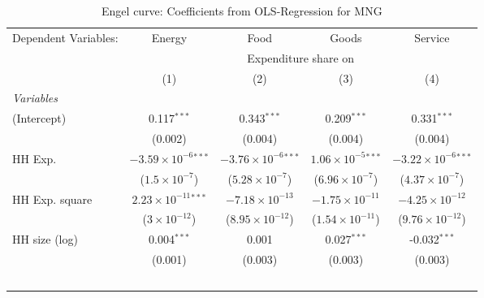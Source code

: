 
\begin{table}[htbp!]
   \centering
   \small
   \begin{adjustbox}{width = 1\textwidth, max height = 0.95\textheight, center}
      \begin{threeparttable}[b]
         \caption{\label{tab:Engel_parametric_MNG} Engel curve: Coefficients from OLS-Regression for MNG}
         \begin{tabular}{lcccc}
            \tabularnewline \midrule \midrule
            Dependent Variables: & Energy                         & Food                           & Goods                         & Service\\  
             & \multicolumn{4}{c}{Expenditure share on} \\ 
                                 & (1)                            & (2)                            & (3)                           & (4)\\  
            \midrule
            \emph{Variables}\\
            (Intercept)          & 0.117$^{***}$                  & 0.343$^{***}$                  & 0.209$^{***}$                 & 0.331$^{***}$\\   
                                 & (0.002)                        & (0.004)                        & (0.004)                       & (0.004)\\   
            HH Exp.              & $-3.59\times 10^{-6}$$^{***}$  & $-3.76\times 10^{-6}$$^{***}$  & $1.06\times 10^{-5}$$^{***}$  & $-3.22\times 10^{-6}$$^{***}$\\    
                                 & ($1.5\times 10^{-7}$)          & ($5.28\times 10^{-7}$)         & ($6.96\times 10^{-7}$)        & ($4.37\times 10^{-7}$)\\    
            HH Exp. square       & $2.23\times 10^{-11}$$^{***}$  & $-7.18\times 10^{-13}$         & $-1.75\times 10^{-11}$        & $-4.25\times 10^{-12}$\\    
                                 & ($3\times 10^{-12}$)           & ($8.95\times 10^{-12}$)        & ($1.54\times 10^{-11}$)       & ($9.76\times 10^{-12}$)\\    
            HH size (log)        & 0.004$^{***}$                  & 0.001                          & 0.027$^{***}$                 & -0.032$^{***}$\\   
                                 & (0.001)                        & (0.003)                        & (0.003)                       & (0.003)\\   
$$
\end{tabular}
\end{threeparttable}
\end{adjustbox}
\end{table}
